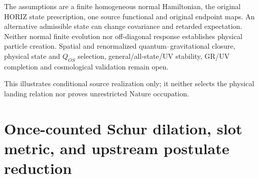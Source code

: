 \documentclass[11pt,a4paper]{article}
\theoremstyle{remark}
\begin{document}
The assumptions are a finite homogeneous normal Hamiltonian, the original
HORIZ state prescription, one source functional and original endpoint maps.
An alternative admissible state can change covariance and retarded expectation.
Neither normal finite evolution nor off-diagonal response establishes
physical particle creation. Spatial and renormalized quantum--gravitational
closure, physical state and $Q_{OS}$ selection, general/all-state/UV stability,
GR/UV completion and cosmological validation remain open.

This illustrates conditional source realization only; it neither selects the physical landing relation nor proves unrestricted Nature occupation.

\section{Once-counted Schur dilation, slot metric, and upstream postulate reduction}
\label{sec:foundations-f17-f20-td0-20261112}
\hypertarget{f17f20td0}{}
\end{document}
